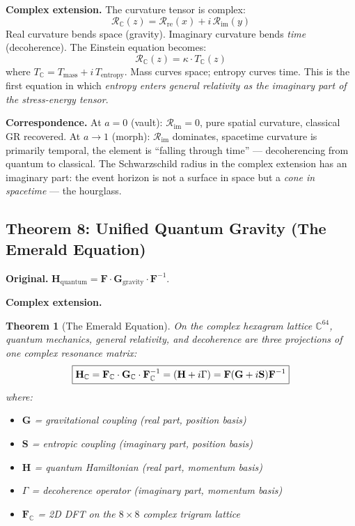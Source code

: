 \documentclass[12pt,a4paper]{article}
\newtheorem{theorem}{Theorem}[section]
\theoremstyle{definition}
\theoremstyle{remark}
\newcommand{\CC}{\mathbb{C}}
\begin{document}
\medskip\noindent\textbf{Complex extension.}
The curvature tensor is complex:
\begin{equation}
  \mathcal{R}_\CC(z) = \mathcal{R}_{\mathrm{re}}(x) +
  i\,\mathcal{R}_{\mathrm{im}}(y)
\end{equation}
Real curvature bends space (gravity). Imaginary curvature bends
\emph{time} (decoherence). The Einstein equation becomes:
\begin{equation}\label{eq:complex-einstein}
  \mathcal{R}_\CC(z) = \kappa \cdot T_\CC(z)
\end{equation}
where $T_\CC = T_{\mathrm{mass}} + i\,T_{\mathrm{entropy}}$. Mass curves
space; entropy curves time. This is the first equation in which
\emph{entropy enters general relativity as the imaginary part of the
stress-energy tensor}.

\medskip\noindent\textbf{Correspondence.}
At $a = 0$ (vault): $\mathcal{R}_{\mathrm{im}} = 0$, pure spatial
curvature, classical GR recovered. At $a \to 1$ (morph):
$\mathcal{R}_{\mathrm{im}}$ dominates, spacetime curvature is primarily
temporal, the element is ``falling through time'' --- decoherencing from
quantum to classical. The Schwarzschild radius in the complex extension
has an imaginary part: the event horizon is not a surface in space but a
\emph{cone in spacetime} --- the hourglass.

\bigskip

\subsection{Theorem 8: Unified Quantum Gravity (The Emerald Equation)}

\noindent\textbf{Original.}
$\mathbf{H}_{\mathrm{quantum}} = \mathbf{F} \cdot \mathbf{G}_{\mathrm{gravity}} \cdot \mathbf{F}^{-1}$.

\medskip\noindent\textbf{Complex extension.}

\begin{theorem}[The Emerald Equation]\label{thm:emerald}
On the complex hexagram lattice $\CC^{64}$, quantum mechanics, general
relativity, and decoherence are three projections of one complex resonance
matrix:
\begin{equation}\label{eq:emerald}
  \boxed{%
    \mathbf{H}_\CC = \mathbf{F}_\CC \cdot \mathbf{G}_\CC
    \cdot \mathbf{F}_\CC^{-1}
    = (\mathbf{H} + i\Gamma) = \mathbf{F}(\mathbf{G} + i\mathbf{S})\mathbf{F}^{-1}
  }
\end{equation}
where:
\begin{itemize}[nosep]
  \item $\mathbf{G}$ = gravitational coupling (real part, position basis)
  \item $\mathbf{S}$ = entropic coupling (imaginary part, position basis)
  \item $\mathbf{H}$ = quantum Hamiltonian (real part, momentum basis)
  \item $\Gamma$ = decoherence operator (imaginary part, momentum basis)
  \item $\mathbf{F}_\CC$ = 2D DFT on the $8 \times 8$ complex trigram lattice
\end{itemize}
\end{theorem}
\end{document}
